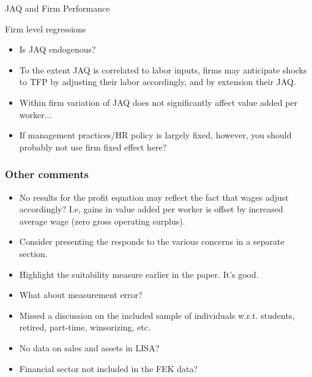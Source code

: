 \documentclass[usenames,dvipsnames,10pt]{beamer}
\begin{document}
\begin{frame}{JAQ and Firm Performance}
\begin{exampleblock}{Firm level regressions}
\end{exampleblock}
\begin{itemize}
\item Is JAQ endogenous? 
\item To the extent JAQ is correlated to labor inputs, firms may anticipate shocks to TFP by adjusting their labor accordingly, and by extension their JAQ. 
\item Within firm variation of JAQ does not significantly affect value added per worker... 
\item If management practices/HR policy is largely fixed, however, you should probably not use firm fixed effect here?  
\end{itemize}
\end{frame}

\begin{frame} 
\frametitle{Other comments} 
\begin{itemize}
    \item No results for the profit equation may reflect the fact that wages adjust accordingly? I.e, gains in value added per worker is offset by increased average wage (zero gross operating surplus).
    \item Consider presenting the responds to the various concerns in a separate section.
    \item Highlight the suitability measure earlier in the paper. It's good.
    \item What about measurement error?
    \item Missed a discussion on the included sample of individuals w.r.t. students, retired, part-time, winsorizing, etc.
    \item No data on sales and assets in LISA?
    \item Financial sector not included in the FEK data?
   \end{itemize}
\end{frame}
\end{document}
